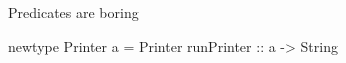 \documentclass[UKenglish,usenames,dvipsnames,svgnames,table,aspectratio=169,mathserif]{beamer}
\newcommand{\nl}{\vspace{\baselineskip}}
\newcommand{\pnl}{\pause \nl}
\begin{document}










\begin{frame}
\Huge \centering
Predicates are boring
\end{frame}










\begin{frame}[fragile]


\begin{haskellcode}
newtype Printer a = Printer {
  runPrinter :: a -> String
}
\end{haskellcode}
\end{frame}
\end{document}
